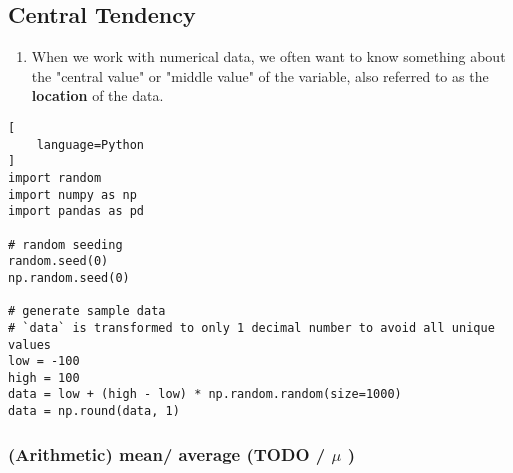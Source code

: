 \subsection{Central Tendency \cite{statistics/book/Statistics-for-Data-Scientists/Maurits-Kaptein}}\label{Data/Describing Data/Central Tendency}

\begin{enumerate}
     \item When we work with numerical data, we often want to know something about the "central value" or "middle value" of the variable, also referred to as the \textbf{location}\label{Data/Describing Data/Central Tendency/location} of the data. \hfill \cite{statistics/book/Statistics-for-Data-Scientists/Maurits-Kaptein}
\end{enumerate}

\begin{lstlisting}[
    language=Python
]
import random
import numpy as np
import pandas as pd

# random seeding
random.seed(0)
np.random.seed(0)

# generate sample data
# `data` is transformed to only 1 decimal number to avoid all unique values
low = -100
high = 100
data = low + (high - low) * np.random.random(size=1000)
data = np.round(data, 1)
\end{lstlisting}

\subsubsection{(Arithmetic) mean/ average (TODO / $\mu$ ) \cite{statistics/book/Statistics-for-Data-Scientists/Maurits-Kaptein}} \label{Data/Describing Data/Central Tendency/(Arithmetic) mean or average}


